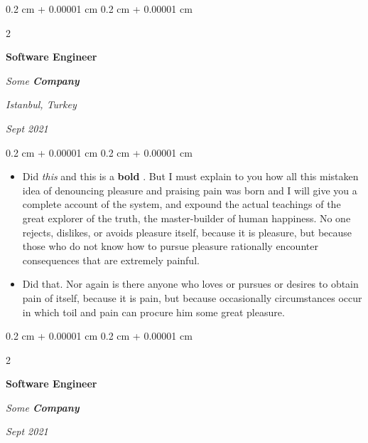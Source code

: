 \documentclass[10pt, letterpaper]{article}
\newenvironment{highlights}{
    \begin{itemize}[
        topsep=0.10 cm,
        parsep=0.10 cm,
        partopsep=0pt,
        itemsep=0pt,
        leftmargin=0.4 cm + 10pt
    ]
}{
    \end{itemize}
} %
\newenvironment{onecolentry}{
    \begin{adjustwidth}{
        0.2 cm + 0.00001 cm
    }{
        0.2 cm + 0.00001 cm
    }
}{
    \end{adjustwidth}
} %
\newenvironment{twocolentry}[2][]{
    \onecolentry
    \def\secondColumn{#2}
    \setcolumnwidth{\fill, 4.5 cm}
    \begin{paracol}{2}
}{
    \switchcolumn \raggedleft \secondColumn
    \end{paracol}
    \endonecolentry
} %
\let\hrefWithoutArrow\href
\renewcommand{\href}[2]{\hrefWithoutArrow{#1}{\ifthenelse{\equal{#2}{}}{ }{#2 }\raisebox{.15ex}{\footnotesize \faExternalLink*}}}
\begin{document}
        \vspace{0.2 cm}

        \begin{twocolentry}{
        \textit{Istanbul, Turkey}    
            
        \textit{Sept 2021}}
            \textbf{Software Engineer}
            
            \textit{Some \textbf{Company}}
        \end{twocolentry}

        \vspace{0.10 cm}
        \begin{onecolentry}
            \begin{highlights}
                \item Did \textit{this} and this is a \textbf{bold} \href{https://example.com}{link}. But I must explain to you how all this mistaken idea of denouncing pleasure and praising pain was born and I will give you a complete account of the system, and expound the actual teachings of the great explorer of the truth, the master-builder of human happiness. No one rejects, dislikes, or avoids pleasure itself, because it is pleasure, but because those who do not know how to pursue pleasure rationally encounter consequences that are extremely painful.
                \item Did that. Nor again is there anyone who loves or pursues or desires to obtain pain of itself, because it is pain, but because occasionally circumstances occur in which toil and pain can procure him some great pleasure.
            \end{highlights}
        \end{onecolentry}


        \vspace{0.2 cm}

        \begin{twocolentry}{
            
            
        \textit{Sept 2021}}
            \textbf{Software Engineer}
            
            \textit{Some \textbf{Company}}
        \end{twocolentry}
\end{document}
